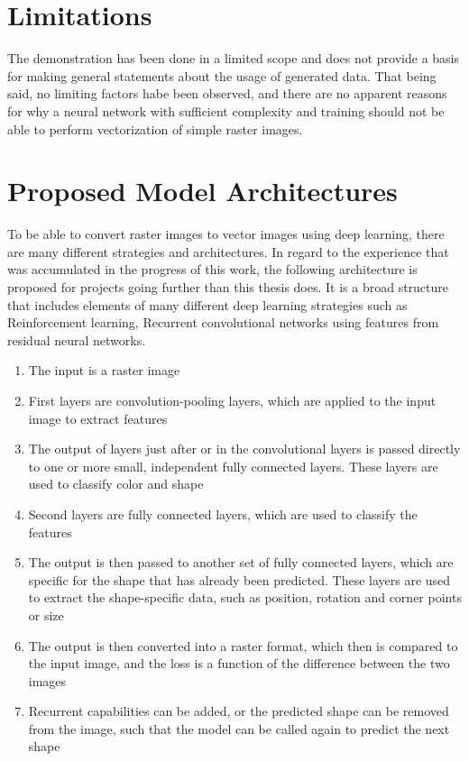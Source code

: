 \documentclass[12pt, a4paper, titlepage]{report}
\begin{document}
\section{Limitations}

The demonstration has been done in a limited scope and does not provide a basis for making general statements about the usage of generated data. That being said, no limiting factors habe been observed, and there are no apparent reasons for why a neural network with sufficient complexity and training should not be able to perform vectorization of simple raster images.

\section{Proposed Model Architectures}

To be able to convert raster images to vector images using deep learning, there are many different strategies and architectures. In regard to the experience that was accumulated in the progress of this work, the following architecture is proposed for projects going further than this thesis does. It is a broad structure that includes elements of many different deep learning strategies such as Reinforcement learning, Recurrent convolutional networks using features from residual neural networks.

\begin{enumerate}
   \item The input is a raster image
   \item First layers are convolution-pooling layers, which are applied to the input image to extract features
   \item The output of layers just after or in the convolutional layers is passed directly to one or more small, independent fully connected layers. These layers are used to classify color and shape
   \item Second layers are fully connected layers, which are used to classify the features
   \item The output is then passed to another set of fully connected layers, which are specific for the shape that has already been predicted. These layers are used to extract the shape-specific data, such as position, rotation and corner points or size
   \item The output is then converted into a raster format, which then is compared to the input image, and the loss is a function of the difference between the two images

   \item Recurrent capabilities can be added, or the predicted shape can be removed from the image, such that the model can be called again to predict the next shape
\end{enumerate}
\end{document}
